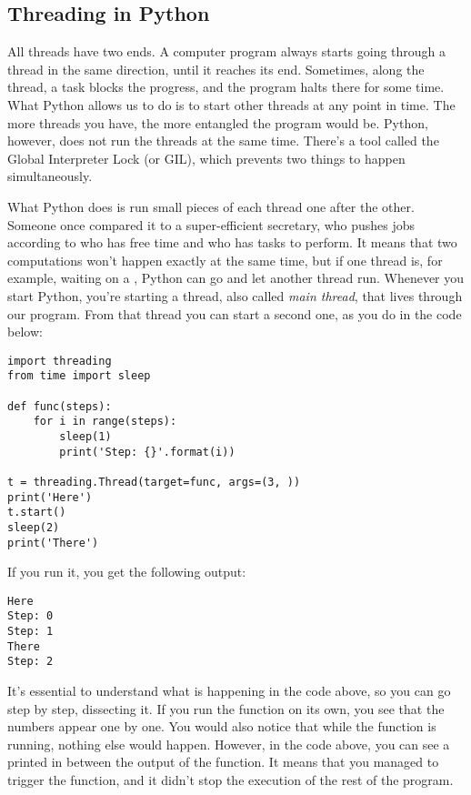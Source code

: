 \subsection{Threading in Python}\label{subsec:multithreading}
All threads have two ends. A computer program always starts going through a thread in the same direction, until it reaches its end. Sometimes, along the thread, a task blocks the progress, and the program halts there for some time. What Python allows us to do is to start other threads at any point in time. The more threads you have, the more entangled the program would be. Python, however, does not run the threads at the same time. There's a tool called the Global Interpreter Lock (or GIL), which prevents two things to happen simultaneously.

What Python does is run small pieces of each thread one after the other. Someone once compared it to a super-efficient secretary, who pushes jobs according to who has free time and who has tasks to perform. It means that two computations won't happen exactly at the same time, but if one thread is, for example, waiting on a , Python can go and let another thread run. Whenever you start Python, you're starting a thread, also called \emph{main thread}, that lives through our program. From that thread you can start a second one, as you do in the code below:

\begin{verbatim}
import threading
from time import sleep

def func(steps):
    for i in range(steps):
        sleep(1)
        print('Step: {}'.format(i))

t = threading.Thread(target=func, args=(3, ))
print('Here')
t.start()
sleep(2)
print('There')
\end{verbatim}

If you run it, you get the following output:

\begin{verbatim}
Here
Step: 0
Step: 1
There
Step: 2
\end{verbatim}

It's essential to understand what is happening in the code above, so you can go step by step, dissecting it. If you run the function  on its own, you see that the numbers appear one by one. You would also notice that while the function is running, nothing else would happen. However, in the code above, you can see a  printed in between the output of the function. It means that you managed to trigger the function, and it didn't stop the execution of the rest of the program.

